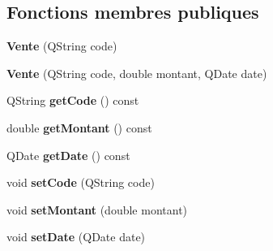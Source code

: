 \subsection*{Fonctions membres publiques}
\begin{DoxyCompactItemize}
\item 
\hypertarget{class_vente_a8c8075658f829ed29559948ecd612ec7}{
{\bfseries Vente} (QString code)}
\label{d8/dd9/class_vente_a8c8075658f829ed29559948ecd612ec7}

\item 
\hypertarget{class_vente_a53b75b82b0582e3ebb68a7285e33a259}{
{\bfseries Vente} (QString code, double montant, QDate date)}
\label{d8/dd9/class_vente_a53b75b82b0582e3ebb68a7285e33a259}

\item 
\hypertarget{class_vente_a6659a83ddd59f8ad810ca6e1b09e32aa}{
QString {\bfseries getCode} () const }
\label{d8/dd9/class_vente_a6659a83ddd59f8ad810ca6e1b09e32aa}

\item 
\hypertarget{class_vente_a9674211d276fa1569f1e69eac769756b}{
double {\bfseries getMontant} () const }
\label{d8/dd9/class_vente_a9674211d276fa1569f1e69eac769756b}

\item 
\hypertarget{class_vente_a9ab711f587a861c6b2e6768609484d44}{
QDate {\bfseries getDate} () const }
\label{d8/dd9/class_vente_a9ab711f587a861c6b2e6768609484d44}

\item 
\hypertarget{class_vente_ad9f91ada87060429df1d27d19ef33bed}{
void {\bfseries setCode} (QString code)}
\label{d8/dd9/class_vente_ad9f91ada87060429df1d27d19ef33bed}

\item 
\hypertarget{class_vente_a677beec64364cb24854928f19b6953b3}{
void {\bfseries setMontant} (double montant)}
\label{d8/dd9/class_vente_a677beec64364cb24854928f19b6953b3}

\item 
\hypertarget{class_vente_a504fec1c6a29ba2d5e96018cd9d12266}{
void {\bfseries setDate} (QDate date)}
\label{d8/dd9/class_vente_a504fec1c6a29ba2d5e96018cd9d12266}

\end{DoxyCompactItemize}
